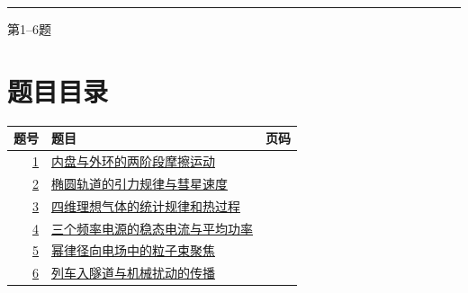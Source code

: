 \documentclass[UTF8,fontset=fandol,a4paper,11pt]{ctexart}
\begin{document}

\thispagestyle{empty}\vspace*{22mm}

\par\vspace{12mm}

\par\vspace{12mm}

\par\vspace{9mm}

\noindent\textcolor{accent}{\rule{\linewidth}{1pt}}\par\vspace{9mm}

\noindent 第1--6题\par\vfill\clearpage

\section*{题目目录}

\begin{longtable}{@{}r p{113mm} r@{}}\toprule 题号 & 题目 & 页码\\\midrule

\hyperref[q:1]{1} & \hyperref[q:1]{内盘与外环的两阶段摩擦运动} & \pageref{q:1} \\

\hyperref[q:2]{2} & \hyperref[q:2]{椭圆轨道的引力规律与彗星速度} & \pageref{q:2} \\

\hyperref[q:3]{3} & \hyperref[q:3]{四维理想气体的统计规律和热过程} & \pageref{q:3} \\

\hyperref[q:4]{4} & \hyperref[q:4]{三个频率电源的稳态电流与平均功率} & \pageref{q:4} \\

\hyperref[q:5]{5} & \hyperref[q:5]{幂律径向电场中的粒子束聚焦} & \pageref{q:5} \\

\hyperref[q:6]{6} & \hyperref[q:6]{列车入隧道与机械扰动的传播} & \pageref{q:6} \\

\bottomrule\end{longtable}

\clearpage
\end{document}
